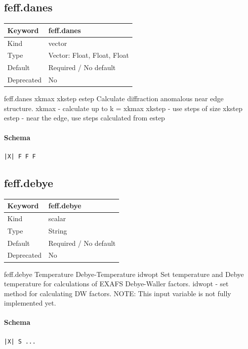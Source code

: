 \documentclass[11pt]{article}
\begin{document}
{{{\subsection{feff.danes}
\label{kw:feff-danes}
\begin{longtable}{|p{1.5in}|p{4.5in}|}
\hline
Keyword & feff.danes \\
\hline
Kind & vector \\
\hline
Type & Vector: Float, Float, Float \\
\hline
Default & Required / No default \\
\hline
Deprecated & No \\
\hline
\end{longtable}
 feff.danes{ xkmax xkstep estep }
 Calculate diffraction anomalous near edge structure.
 xkmax  - calculate up to k = xkmax
 xkstep - use steps of size xkstep
 estep  - near the edge, use steps calculated from estep

\paragraph{Schema}
\begin{Verbatim}
|X| F F F
\end{Verbatim}

\subsection{feff.debye}
\label{kw:feff-debye}
\begin{longtable}{|p{1.5in}|p{4.5in}|}
\hline
Keyword & feff.debye \\
\hline
Kind & scalar \\
\hline
Type & String \\
\hline
Default & Required / No default \\
\hline
Deprecated & No \\
\hline
\end{longtable}
 feff.debye{ Temperature Debye-Temperature idwopt }
 Set temperature and Debye temperature for calculations of EXAFS Debye-Waller
 factors.
   idwopt - set method for calculating DW factors.
 NOTE: This input variable is not fully implemented yet.

\paragraph{Schema}
\begin{Verbatim}
|X| S ...
\end{Verbatim}

}}}
\end{document}

